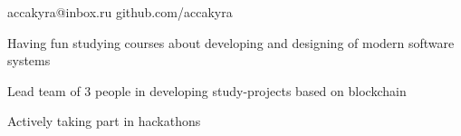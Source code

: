 \documentclass[]{cv-style}
\begin{document}

    \vspace{1.5cm}

    {\color{white} \hspace*{-1cm} \LARGE{accakyra@inbox.ru}}
    {\color{white} \hspace*{1cm} \LARGE{github.com/accakyra}}

    \vspace{1.5cm}


    \vspace{0.2cm}
    \hspace*{0.7cm} {Having fun studying courses about developing and designing of modern software systems}
    {\par}
    \hspace*{0.7cm} {Lead team of 3 people in developing study-projects based on blockchain}
    {\par}
    \hspace*{0.7cm} {Actively taking part in hackathons}
    \vspace{0.3cm}
    {\newline}

    \vspace{1cm}

\end{document}
